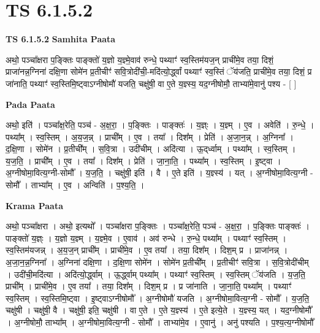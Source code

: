 \documentclass[17pt]{extarticle}
\begin{document}
\section{ TS 6.1.5.2 }

\textbf{TS 6.1.5.2 } \newline
\textbf{Samhita Paata} \newline

अथो॒ पञ्चा᳚क्षरा प॒ङ्क्तिः पाङ्क्तो॑ य॒ज्ञो य॒ज्ञ्मे॒वाव॑ रुन्धे॒ पथ्याꣳ॑ स्व॒स्तिम॑यज॒न् प्राची॑मे॒व तया॒ दिशं॒ प्राजा॑नन्न॒ग्निना॑ दक्षि॒णा सोमे॑न प्र॒तीचीꣳ॑ सवि॒त्रोदी॑ची॒-मदि॑त्यो॒र्द्ध्वां पथ्याꣳ॑ स्व॒स्तिं  ॅय॑जति॒ प्राची॑मे॒व तया॒ दिशं॒ प्र जा॑नाति॒ पथ्याꣳ॑ स्व॒स्तिमि॒ष्ट्वाऽग्नीषोमौ॑ यजति॒ चक्षु॑षी॒ वा ए॒ते य॒ज्ञ्स्य॒ यद॒ग्नीषोमौ॒ ताभ्या॑मे॒वानु॑ पश्य - [  ] \newline

\textbf{Pada Paata} \newline

अथो॒ इति॑ । पञ्चा᳚क्ष॒रेति॒ पञ्च॑ - अ॒क्ष॒रा॒ । प॒ङ्क्तिः । पाङ्क्तः॑ । य॒ज्ञ्ः । य॒ज्ञ्म् । ए॒व । अवेति॑ । रु॒न्धे॒ । पथ्या᳚म् । स्व॒स्तिम् । अ॒य॒ज॒न्न् । प्राची᳚म् । ए॒व । तया᳚ । दिश᳚म् । प्रेति॑ । अ॒जा॒न॒न्न् । अ॒ग्निना᳚ । द॒क्षि॒णा । सोमे॑न । प्र॒तीची᳚म् । स॒वि॒त्रा । उदी॑चीम् । अदि॑त्या । ऊ॒द्‌र्ध्वाम् । पथ्या᳚म् । स्व॒स्तिम् । य॒ज॒ति॒ । प्राची᳚म् । ए॒व । तया᳚ । दिश᳚म् । प्रेति॑ । जा॒ना॒ति॒ । पथ्या᳚म् । स्व॒स्तिम् । इ॒ष्ट्वा । अ॒ग्नीषोमा॒वित्य॒ग्नी-सोमौ᳚ । य॒ज॒ति॒ । चक्षु॑षी॒ इति॑ । वै । ए॒ते इति॑ । य॒ज्ञ्स्य॑ । यत् । अ॒ग्नीषोमा॒वित्य॒ग्नी - सोमौ᳚ । ताभ्या᳚म् । ए॒व । अन्विति॑ । प॒श्य॒ति॒ ।  \newline


\textbf{Krama Paata} \newline

अथो॒ पञ्चा᳚क्षरा । अथो॒ इत्यथो᳚ । पञ्चा᳚क्षरा प॒ङ्‍क्तिः । पञ्चा᳚क्ष॒रेति॒ पञ्च॑ - अ॒क्ष॒रा॒ । प॒ङ्‍क्तिः पाङ्‍क्तः॑ । पाङ्‍क्तो॑ य॒ज्ञ्ः । य॒ज्ञो य॒ज्ञ्म् । य॒ज्ञ्मे॒व । ए॒वाव॑ । अव॑ रुन्धे । रु॒न्धे॒ पथ्या᳚म् । पथ्याꣳ॑ स्व॒स्तिम् । स्व॒स्तिम॑यजन्न् । अ॒य॒ज॒न् प्राची᳚म् । प्राची॑मे॒व । ए॒व तया᳚ । तया॒ दिश᳚म् । दिश॒म् प्र । प्राजा॑नन्न् । अ॒जा॒न॒न्न॒ग्निना᳚ । अ॒ग्निना॑ दक्षि॒णा । द॒क्षि॒णा सोमे॑न । सोमे॑न प्र॒तीची᳚म् । प्र॒तीचीꣳ॑ सवि॒त्रा । स॒वि॒त्रोदी॑चीम् । उदी॑ची॒मदि॑त्या । अदि॑त्यो॒र्द्ध्वाम् । ऊ॒र्द्ध्वाम् पथ्या᳚म् । पथ्याꣳ॑ स्व॒स्तिम् । स्व॒स्तिम् ॅय॑जति । य॒ज॒ति॒ प्राची᳚म् । प्राची॑मे॒व । ए॒व तया᳚ । तया॒ दिश᳚म् । दिश॒म् प्र । प्र जा॑नाति । जा॒ना॒ति॒ पथ्या᳚म् । पथ्याꣳ॑ स्व॒स्तिम् । स्व॒स्तिमि॒ष्ट्वा । इ॒ष्ट्वाऽग्नीषोमौ᳚ । अ॒ग्नीषोमौ॑ यजति । अ॒ग्नीषोमा॒वित्य॒ग्नी - सोमौ᳚ । य॒ज॒ति॒ चक्षु॑षी । चक्षु॑षी॒ वै । चक्षु॑षी॒ इति॒ चक्षु॑षी । वा ए॒ते । ए॒ते य॒ज्ञ्स्य॑ । ए॒ते इत्ये॒ते । य॒ज्ञ्स्य॒ यत् । यद॒ग्नीषोमौ᳚ । अ॒ग्नीषोमौ॒ ताभ्या᳚म् । अ॒ग्नीषोमा॒वित्य॒ग्नी - सोमौ᳚ । ताभ्या॑मे॒व । ए॒वानु॑ । अनु॑ पश्यति । प॒श्य॒त्य॒ग्नीषोमौ᳚ \newline
\end{document}
